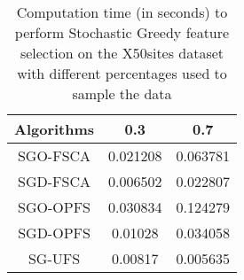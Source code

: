 \begin{table}
	\begin{center}
		\begin{tabular}{c c c}
			Algorithms & 0.3 & 0.7 \\
			\hline
			SGO-FSCA & 0.021208 & 0.063781 \\
			SGD-FSCA & 0.006502 & 0.022807 \\
			SGO-OPFS & 0.030834 & 0.124279 \\
			SGD-OPFS & 0.01028 & 0.034058 \\
			SG-UFS & 0.00817 & 0.005635 \\
		\end{tabular}
	\end{center}
	\caption{Computation time (in seconds) to perform Stochastic Greedy feature selection on the X50sites dataset with different percentages used to sample the data}
\end{table}